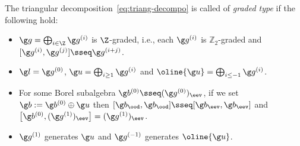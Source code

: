\documentclass[12pt]{amsart}
\begin{document}
\begin{dfn}
\label{dfn:gradedtyp}
The triangular decomposition~\eqref{eq:triang-decompo} is called of \emph{graded type} if the following hold:
\begin{itemize}
\item[(i)] $\g g=\bigoplus_{i\in \Z}\g g^{(i)}$ is $\Z$-graded, i.e., each $\g g^{(i)}$ is $\mathbb Z_2$-graded and 
$[\g g^{(i)},\g g^{(j)}]\sseq \g g^{(i+j)}$.

\item[(ii)] $\g l=\g g^{(0)}$, $\g u=\bigoplus_{i\geq 1}\g g^{(i)}$ and 
$\oline{\g u}=\bigoplus_{i\leq -1}\g g^{(i)}$.

\item[(iii)] For some Borel subalgebra $\g b^{(0)}\sseq (\g g^{(0)})_\eev$, if we set $\g b:=\g b^{(0)}\oplus \g u$ then 
$
[\g b_\ood,\g b_\ood]\sseq [\g b_\eev,\g b_\eev]
$ and 
$\left[\g b^{(0)},(\g g^{(1)})_\eev\right]=(\g g^{(1)})_\eev$.
\item[(iv)] $\g g^{(1)}$ generates $\g u$ and $\g g^{(-1)}$ generates $\oline{\g u}$. 

\end{itemize}

\end{dfn}
\end{document}
